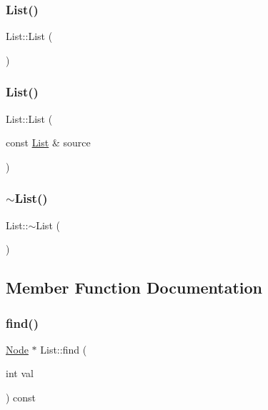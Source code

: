 \subsubsection{\texorpdfstring{List()}{List()}\hspace{0.1cm}{\footnotesize\ttfamily [1/2]}}
{\footnotesize\ttfamily List\+::\+List (\begin{DoxyParamCaption}{ }\end{DoxyParamCaption})}

\mbox{\label{classList_a8330042d1deb6695fc7516d1ea5552f9}} 
\subsubsection{\texorpdfstring{List()}{List()}\hspace{0.1cm}{\footnotesize\ttfamily [2/2]}}
{\footnotesize\ttfamily List\+::\+List (\begin{DoxyParamCaption}\item[{const \mbox{\hyperlink{classList}{List}} \&}]{source }\end{DoxyParamCaption})}

\mbox{\label{classList_a70aecf37bd9d779a394e4d50377fbf5f}} 
\subsubsection{\texorpdfstring{$\sim$\+List()}{~List()}}
{\footnotesize\ttfamily List\+::$\sim$\+List (\begin{DoxyParamCaption}{ }\end{DoxyParamCaption})}



\subsection{Member Function Documentation}
\mbox{\label{classList_a7d2bb48045c781a76a0daf2a4dc7d8fc}} 
\subsubsection{\texorpdfstring{find()}{find()}}
{\footnotesize\ttfamily \mbox{\hyperlink{classNode}{Node}} $\ast$ List\+::find (\begin{DoxyParamCaption}\item[{int}]{val }\end{DoxyParamCaption}) const}

